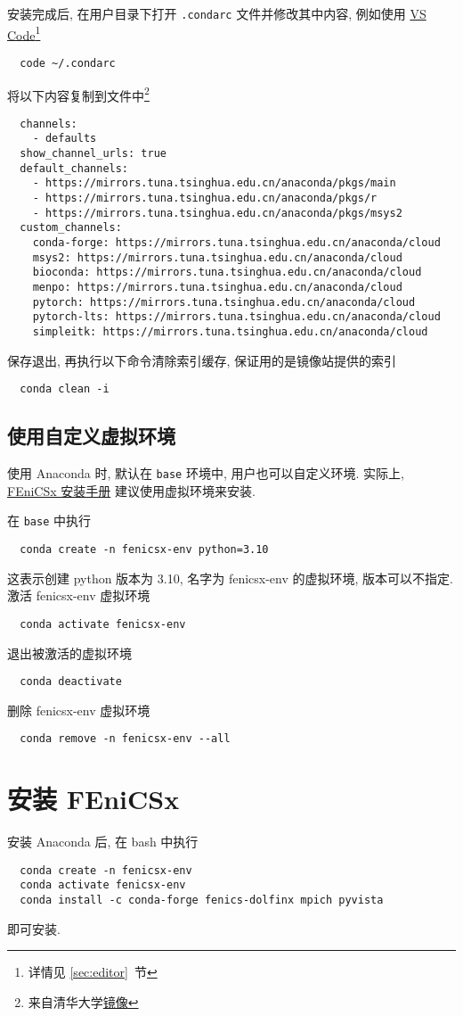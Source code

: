 \documentclass[fontset=founder]{ctexrep}
\begin{document}
安装完成后,
在用户目录下打开 \texttt{.condarc} 文件并修改其中内容,
例如使用 \href{https://code.visualstudio.com/}{VS Code}\footnote{详情见 \ref{sec:editor}~节}
\begin{lstlisting}
  code ~/.condarc
\end{lstlisting}
将以下内容复制到文件中\footnote{来自清华大学\href{https://mirrors.tuna.tsinghua.edu.cn/help/anaconda/}{镜像}}
\begin{lstlisting}
  channels:
    - defaults
  show_channel_urls: true
  default_channels:
    - https://mirrors.tuna.tsinghua.edu.cn/anaconda/pkgs/main
    - https://mirrors.tuna.tsinghua.edu.cn/anaconda/pkgs/r
    - https://mirrors.tuna.tsinghua.edu.cn/anaconda/pkgs/msys2
  custom_channels:
    conda-forge: https://mirrors.tuna.tsinghua.edu.cn/anaconda/cloud
    msys2: https://mirrors.tuna.tsinghua.edu.cn/anaconda/cloud
    bioconda: https://mirrors.tuna.tsinghua.edu.cn/anaconda/cloud
    menpo: https://mirrors.tuna.tsinghua.edu.cn/anaconda/cloud
    pytorch: https://mirrors.tuna.tsinghua.edu.cn/anaconda/cloud
    pytorch-lts: https://mirrors.tuna.tsinghua.edu.cn/anaconda/cloud
    simpleitk: https://mirrors.tuna.tsinghua.edu.cn/anaconda/cloud
\end{lstlisting}
保存退出,
再执行以下命令清除索引缓存,
保证用的是镜像站提供的索引
\begin{lstlisting}
  conda clean -i
\end{lstlisting}

\subsection{使用自定义虚拟环境}

使用 Anaconda 时,
默认在 \texttt{base} 环境中,
用户也可以自定义环境.
实际上,
\href{https://github.com/FEniCS/dolfinx#conda}{FEniCSx 安装手册}%
建议使用虚拟环境来安装.

在 \texttt{base} 中执行
\begin{lstlisting}
  conda create -n fenicsx-env python=3.10
\end{lstlisting}
这表示创建 python 版本为 3.10,
名字为 fenicsx-env 的虚拟环境,
版本可以不指定.
激活 fenicsx-env 虚拟环境
\begin{lstlisting}
  conda activate fenicsx-env
\end{lstlisting}
退出被激活的虚拟环境
\begin{lstlisting}
  conda deactivate
\end{lstlisting}
删除 fenicsx-env 虚拟环境
\begin{lstlisting}
  conda remove -n fenicsx-env --all
\end{lstlisting}

\section{安装 FEniCSx}

安装 Anaconda 后,
在 \textsf{bash} 中执行
\begin{lstlisting}
  conda create -n fenicsx-env
  conda activate fenicsx-env
  conda install -c conda-forge fenics-dolfinx mpich pyvista
\end{lstlisting}
即可安装.
\end{document}
